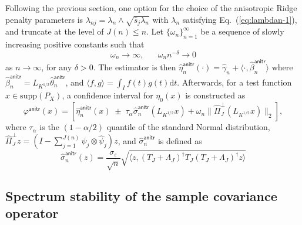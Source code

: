 \documentclass[11pt,a4paper]{article}
\renewcommand{\hat}{\widehat}
\theoremstyle{definition}
\theoremstyle{plain}
\theoremstyle{remark}
\newcommand{\supp}{\mathrm{supp}}
\newcommand{\ud}{\mathrm d}
\newcommand{\anitr}{\mathsf{anitr}}
\begin{document}
Following the previous section, one option for the choice of the anisotropic Ridge penalty parameters is $\lambda_{nj}=\lambda_n\wedge\sqrt{\hat s_j\lambda_n}$ with $\lambda_n$ satisfying Eq.~(\ref{eq:lambdan-1}),
and truncate at the level of $J(n)\leq n$.
Let $\{\omega_n\}_{n=1}^{\infty}$ be a sequence of slowly increasing positive constants such that
\begin{equation}
\omega_n\to\infty,\;\;\;\;\;\;\omega_n n^{-\delta}\to 0
\label{eq:omega}
\end{equation}
as $n\to\infty$, for any $\delta>0$.
The estimator is then $\hat\eta_n^\anitr(\cdot)=\hat\gamma_n + \langle\cdot,\hat\beta_n^\anitr\rangle$ where $\hat\beta_n^\anitr = L_{K^{1/2}}\hat\theta_n^\anitr$,
and $\langle f,g\rangle = \int_I f(t)g(t)\ud t$.
Afterwards, for a test function $x\in\supp(P_X)$, a confidence interval for $\eta_0(x)$ is constructed as
$$
\varphi^\anitr(x) = [\hat\eta_n^\anitr(x)\;\pm\; \tau_{\alpha}\hat\sigma_n^\anitr(L_{K^{1/2}}x) + \omega_n\|\hat\Pi_J^\perp (L_{K^{1/2}}x)\|_2],
$$
where $\tau_{\alpha}$ is the $(1-\alpha/2)$ quantile of the standard Normal distribution, $\hat\Pi_J^\perp z=(I-\sum_{j=1}^{J(n)}\hat\psi_j\otimes\hat\psi_j)z$, and $\hat\sigma_n^\anitr$ is defined as
$$
\hat\sigma_n^\anitr(z) = \frac{\sigma_\varepsilon}{\sqrt{n}}\sqrt{\langle z, (T_J+\Lambda_J)^\dagger T_J(T_J+\Lambda_J)^\dagger z\rangle}
$$


\subsection{Spectrum stability of the sample covariance operator}
\end{document}
